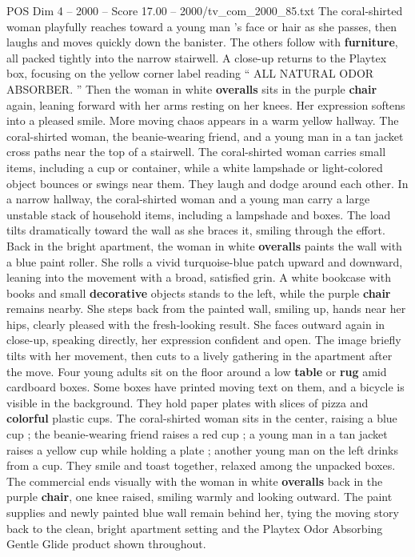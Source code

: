\begin{textsample}{POS Dim 4 – 2000 – Score 17.00 – 2000/tv\_com\_2000\_85.txt}
The coral-shirted woman playfully reaches toward a young man ’s face or hair as she passes, then laughs and moves quickly down the banister.
The others follow with \textbf{furniture}, all packed tightly into the narrow stairwell.
A close-up returns to the Playtex box, focusing on the yellow corner label reading “ ALL NATURAL ODOR ABSORBER. ” Then the woman in white \textbf{overalls} sits in the purple \textbf{chair} again, leaning forward with her arms resting on her knees.
Her expression softens into a pleased smile.
More moving chaos appears in a warm yellow hallway.
The coral-shirted woman, the beanie-wearing friend, and a young man in a tan jacket cross paths near the top of a stairwell.
The coral-shirted woman carries small items, including a cup or container, while a white lampshade or light-colored object bounces or swings near them.
They laugh and dodge around each other.
In a narrow hallway, the coral-shirted woman and a young man carry a large unstable stack of household items, including a lampshade and boxes.
The load tilts dramatically toward the wall as she braces it, smiling through the effort.
Back in the bright apartment, the woman in white \textbf{overalls} paints the wall with a blue paint roller.
She rolls a vivid turquoise-blue patch upward and downward, leaning into the movement with a broad, satisfied grin.
A white bookcase with books and small \textbf{decorative} objects stands to the left, while the purple \textbf{chair} remains nearby.
She steps back from the painted wall, smiling up, hands near her hips, clearly pleased with the fresh-looking result.
She faces outward again in close-up, speaking directly, her expression confident and open.
The image briefly tilts with her movement, then cuts to a lively gathering in the apartment after the move.
Four young adults sit on the floor around a low \textbf{table} or \textbf{rug} amid cardboard boxes.
Some boxes have printed moving text on them, and a bicycle is visible in the background.
They hold paper plates with slices of pizza and \textbf{colorful} plastic cups.
The coral-shirted woman sits in the center, raising a blue cup ; the beanie-wearing friend raises a red cup ; a young man in a tan jacket raises a yellow cup while holding a plate ; another young man on the left drinks from a cup.
They smile and toast together, relaxed among the unpacked boxes.
The commercial ends visually with the woman in white \textbf{overalls} back in the purple \textbf{chair}, one knee raised, smiling warmly and looking outward.
The paint supplies and newly painted blue wall remain behind her, tying the moving story back to the clean, bright apartment setting and the Playtex Odor Absorbing Gentle Glide product shown throughout.

\end{textsample}
